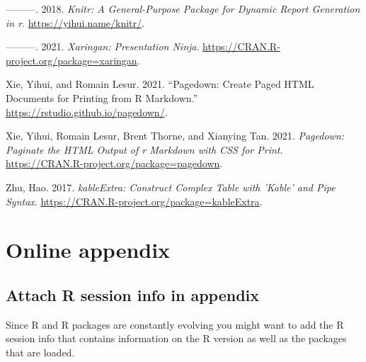 \documentclass[
  letterpaper,
  DIV=11,
  numbers=noendperiod]{scrartcl}
\newlength{\cslhangindent}
\newlength{\cslentryspacingunit} %
\newenvironment{CSLReferences}[2] %
 {%
  \setlength{\parindent}{0pt}
  \ifodd #1
  \let\oldpar\par
  \def\par{\hangindent=\cslhangindent\oldpar}
  \fi
  \setlength{\parskip}{#2\cslentryspacingunit}
 }%
 {}
\begin{document}
\begin{CSLReferences}{1}{0}
\leavevmode{}%
---------. 2018. \emph{Knitr: A General-Purpose Package for Dynamic
Report Generation in r}. \url{https://yihui.name/knitr/}.

\leavevmode{}%
---------. 2021. \emph{Xaringan: Presentation Ninja}.
\url{https://CRAN.R-project.org/package=xaringan}.

\leavevmode{}%
Xie, Yihui, and Romain Lesur. 2021. {``Pagedown: Create Paged {HTML}
Documents for Printing from {R} Markdown.''}
\url{https://rstudio.github.io/pagedown/}.

\leavevmode{}%
Xie, Yihui, Romain Lesur, Brent Thorne, and Xianying Tan. 2021.
\emph{Pagedown: Paginate the HTML Output of r Markdown with CSS for
Print}. \url{https://CRAN.R-project.org/package=pagedown}.

\leavevmode{}%
Zhu, Hao. 2017. \emph{kableExtra: Construct Complex Table with 'Kable'
and Pipe Syntax}. \url{https://CRAN.R-project.org/package=kableExtra}.

\end{CSLReferences}

\newpage

\hypertarget{online-appendix}{%
\section*{Online appendix}\label{online-appendix}}

\hypertarget{sec:rsessioninfo}{%
\subsection{Attach R session info in appendix}\label{sec:rsessioninfo}}

Since R and R packages are constantly evolving you might want to add the
R session info that contains information on the R version as well as the
packages that are loaded.
\end{document}
